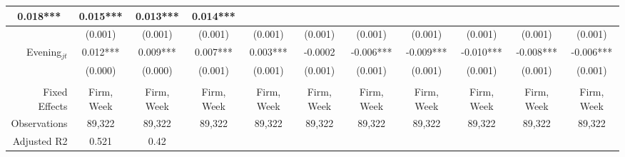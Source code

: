 \begin{table}
{\begin{tabular}{rcccccccccc}
  \multicolumn{1}{c|}{0.018***} &
  \multicolumn{1}{c|}{0.015***} &
  \multicolumn{1}{c|}{0.013***} &
  \multicolumn{1}{c|}{0.014***} \\ \hline
\multicolumn{1}{|r|}{} &
  \multicolumn{1}{c|}{(0.001)} &
  \multicolumn{1}{c|}{(0.001)} &
  \multicolumn{1}{c|}{(0.001)} &
  \multicolumn{1}{c|}{(0.001)} &
  \multicolumn{1}{c|}{(0.001)} &
  \multicolumn{1}{c|}{(0.001)} &
  \multicolumn{1}{c|}{(0.001)} &
  \multicolumn{1}{c|}{(0.001)} &
  \multicolumn{1}{c|}{(0.001)} &
  \multicolumn{1}{c|}{(0.001)} \\ \hline
\multicolumn{1}{|r|}{Evening$_{jt}$} &
  \multicolumn{1}{c|}{0.012***} &
  \multicolumn{1}{c|}{0.009***} &
  \multicolumn{1}{c|}{0.007***} &
  \multicolumn{1}{c|}{0.003***} &
  \multicolumn{1}{c|}{-0.0002} &
  \multicolumn{1}{c|}{-0.006***} &
  \multicolumn{1}{c|}{-0.009***} &
  \multicolumn{1}{c|}{-0.010***} &
  \multicolumn{1}{c|}{-0.008***} &
  \multicolumn{1}{c|}{-0.006***} \\ \hline
\multicolumn{1}{|r|}{} &
  \multicolumn{1}{c|}{(0.000)} &
  \multicolumn{1}{c|}{(0.000)} &
  \multicolumn{1}{c|}{(0.001)} &
  \multicolumn{1}{c|}{(0.001)} &
  \multicolumn{1}{c|}{(0.001)} &
  \multicolumn{1}{c|}{(0.001)} &
  \multicolumn{1}{c|}{(0.001)} &
  \multicolumn{1}{c|}{(0.001)} &
  \multicolumn{1}{c|}{(0.001)} &
  \multicolumn{1}{c|}{(0.001)} \\ \hline
 &
   &
   &
   &
  \multicolumn{1}{l}{} &
  \multicolumn{1}{l}{} &
  \multicolumn{1}{l}{} &
  \multicolumn{1}{l}{} &
  \multicolumn{1}{l}{} &
  \multicolumn{1}{l}{} &
  \multicolumn{1}{l}{} \\ \hline
\multicolumn{1}{|r|}{Fixed Effects} &
  \multicolumn{1}{c|}{Firm, Week} &
  \multicolumn{1}{c|}{Firm, Week} &
  \multicolumn{1}{c|}{Firm, Week} &
  \multicolumn{1}{c|}{Firm, Week} &
  \multicolumn{1}{c|}{Firm, Week} &
  \multicolumn{1}{c|}{Firm, Week} &
  \multicolumn{1}{c|}{Firm, Week} &
  \multicolumn{1}{c|}{Firm, Week} &
  \multicolumn{1}{c|}{Firm, Week} &
  \multicolumn{1}{c|}{Firm, Week} \\ \hline
\multicolumn{1}{|r|}{Observations} &
  \multicolumn{1}{c|}{89,322} &
  \multicolumn{1}{c|}{89,322} &
  \multicolumn{1}{c|}{89,322} &
  \multicolumn{1}{c|}{89,322} &
  \multicolumn{1}{c|}{89,322} &
  \multicolumn{1}{c|}{89,322} &
  \multicolumn{1}{c|}{89,322} &
  \multicolumn{1}{c|}{89,322} &
  \multicolumn{1}{c|}{89,322} &
  \multicolumn{1}{c|}{89,322} \\ \hline
\multicolumn{1}{|r|}{Adjusted R2} &
  \multicolumn{1}{c|}{0.521} &
  \multicolumn{1}{c|}{0.42} &

\end{tabular}}
\end{table}
